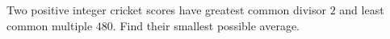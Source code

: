 Two positive integer cricket scores have greatest common divisor $2$ and least common multiple $480$. Find their smallest possible average.
